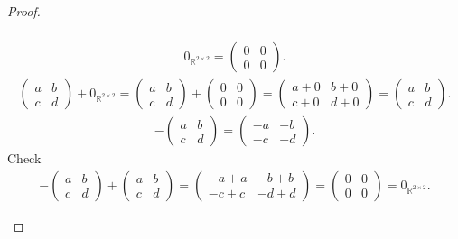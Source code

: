 \documentclass{amsart}
\newcommand{\bbr}{\mathbb{R}}
\newcommand{\aaa}{\left(\begin{smallmatrix}a&b\\c&d\end{smallmatrix}\right)}
\theoremstyle{plain}
\theoremstyle{definition}
\begin{document}
\begin{proof}
\begin{enumerate}[(a)]
\begin{align*}
	    	\end{align*}
	    	\begin{align*}
	    	0_{\bbr^{2\times 2}} = \left(\begin{smallmatrix}0&0\\0&0\end{smallmatrix}\right).
	    	\end{align*}
			\begin{align*}
	        \aaa + 0_{\bbr^{2\times 2}} = \aaa + \left(\begin{smallmatrix}0&0\\0&0\end{smallmatrix}\right) = \left(\begin{smallmatrix}a+0&b+0\\c+0&d+0\end{smallmatrix}\right) = \aaa.
			\end{align*}
			\begin{align*}
			-\aaa = \left(\begin{smallmatrix}-a&-b\\-c&-d\end{smallmatrix}\right).
			\end{align*}
			Check
			\begin{align*}
			-\aaa+\aaa = \left(\begin{smallmatrix}-a+a&-b+b\\-c+c&-d+d\end{smallmatrix}\right) = \left(\begin{smallmatrix}0&0\\0&0\end{smallmatrix}\right) = 0_{\bbr^{2\times 2}}.
		    \end{align*}


\end{enumerate}
\end{proof}
\end{document}
